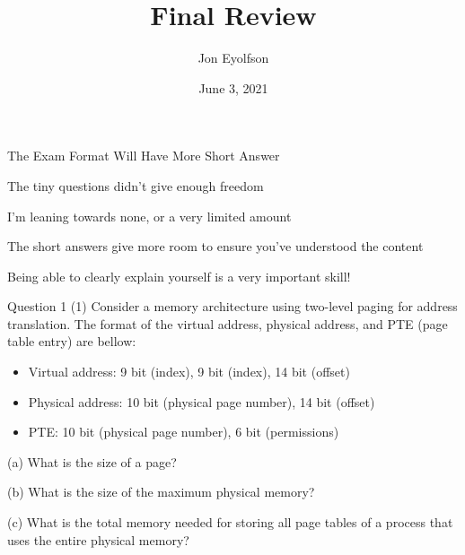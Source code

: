 

\title{Final Review}
\author{Jon Eyolfson}
\date{June 3, 2021}


  \begin{frame}
    \titlepage
  \end{frame}

  \begin{frame}{The Exam Format Will Have More Short Answer}

    The tiny questions didn't give enough freedom

    \hspace{2em} I'm leaning towards none, or a very limited amount

    \vspace{2em}

    The short answers give more room to ensure you've understood the content

    \vspace{2em}

    Being able to clearly explain yourself is a very important skill!
  \end{frame}

  \begin{frame}{Question 1 (1)}
    Consider a memory architecture using two-level paging for address
    translation.
    The format of the virtual address, physical address, and PTE (page table
    entry) are bellow:
    \begin{itemize}
      \item Virtual address: 9 bit (index), 9 bit (index), 14 bit (offset)
      \item Physical address: 10 bit (physical page number), 14 bit (offset)
      \item PTE: 10 bit (physical page number), 6 bit (permissions)
    \end{itemize}

    \vspace{1em}

    (a) What is the size of a page?

    \vspace{1em}

    (b) What is the size of the maximum physical memory?

    \vspace{1em}

    (c) What is the total memory needed for storing all page tables of a process
        that uses the entire physical memory?
  \end{frame}


